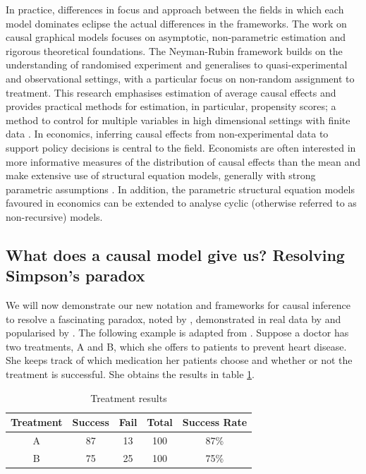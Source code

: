 \documentclass[11pt,a4paper,oneside]{book}
\theoremstyle{plain}
\theoremstyle{definition}
\begin{document}
In practice, differences in focus and approach between the fields in which each model dominates eclipse the actual differences in the frameworks. The work on causal graphical models \citep{Pearl2000,Sprites2000} focuses on asymptotic, non-parametric estimation and rigorous theoretical foundations. The Neyman-Rubin framework builds on the understanding of randomised experiment and generalises to quasi-experimental and observational settings, with a particular focus on non-random assignment to treatment. This research emphasises estimation of average causal effects and provides practical methods for estimation, in particular, propensity scores; a method to control for multiple variables in high dimensional settings with finite data \citep{Rosenbaum1983}. In economics, inferring causal effects from non-experimental data to support policy decisions is central to the field. Economists are often interested in more informative measures of the distribution of causal effects than the mean and make extensive use of structural equation models, generally with strong parametric assumptions \citep{Heckman2008}. In addition, the parametric structural equation models favoured in economics can be extended to analyse cyclic (otherwise referred to as non-recursive) models. 

\subsection{What does a causal model give us? Resolving Simpson's paradox}

We will now demonstrate our new notation and frameworks for causal inference to resolve a fascinating paradox, noted by \citet{yule1903notes}, demonstrated in real data by \citet{Cohen1934} and popularised by \citet{simpson1951interpretation}. The following example is adapted from \citet{Pearl2000}. Suppose a doctor has two treatments, A and B, which she offers to patients to prevent heart disease. She keeps track of which medication her patients choose and whether or not the treatment is successful. She obtains the results in table \ref{tab:simpson1}.

\begin{table}[h]
\caption{Treatment results}
\label{tab:simpson1}
\center
\begin{tabular}{c c c c c}
Treatment & Success & Fail & Total & Success Rate\\
\hline
\rowcolor[gray]{0.9} 
A &  87 & 13 & 100 & 87\%\\
\rowcolor{white} B & 75 & 25 & 100 & 75\%\\
\hline
\end{tabular}
\end{table}
\end{document}
